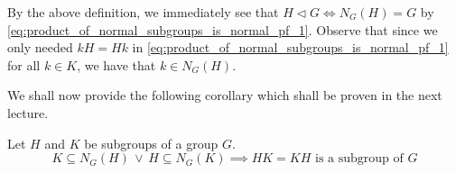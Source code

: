 \begin{note}
  By the above definition, we immediately see that $H \triangleleft G \iff N_G(H) = G$ by \cref{eq:product_of_normal_subgroups_is_normal_pf_1}. Observe that since we only needed $kH = Hk$ in \cref{eq:product_of_normal_subgroups_is_normal_pf_1} for all $k \in K$, we have that $k \in N_G(H)$.
\end{note}

We shall now provide the following corollary which shall be proven in the next lecture.

\begin{crlynonum}
  Let $H$ and $K$ be subgroups of a group $G$.
  \begin{equation*}
    K \subseteq N_G(H) \, \lor \, H \subseteq N_G(K) \implies HK = KH \text{ is a subgroup of } G
  \end{equation*}
\end{crlynonum}



